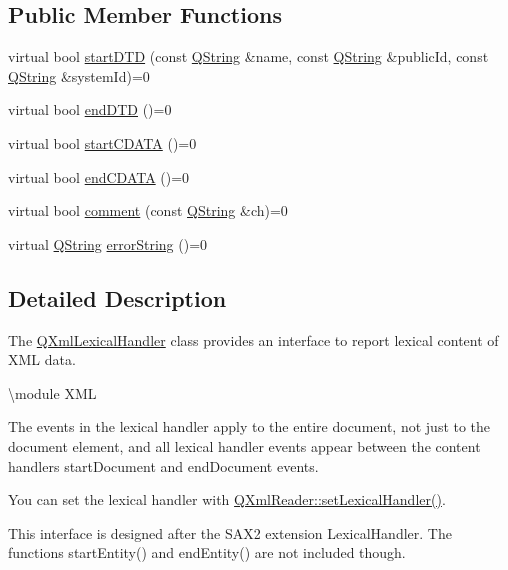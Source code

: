 \subsection*{Public Member Functions}
\begin{DoxyCompactItemize}
\item 
virtual bool \mbox{\hyperlink{class_q_xml_lexical_handler_a1bdcb91e384a32b218d04304e1116808}{start\+D\+TD}} (const \mbox{\hyperlink{class_q_string}{Q\+String}} \&name, const \mbox{\hyperlink{class_q_string}{Q\+String}} \&public\+Id, const \mbox{\hyperlink{class_q_string}{Q\+String}} \&system\+Id)=0
\item 
virtual bool \mbox{\hyperlink{class_q_xml_lexical_handler_a7f5188d7a0a54b6c276c5e7e2faa72bc}{end\+D\+TD}} ()=0
\item 
virtual bool \mbox{\hyperlink{class_q_xml_lexical_handler_a64c691b5eeae5af0230d5fad46be2df2}{start\+C\+D\+A\+TA}} ()=0
\item 
virtual bool \mbox{\hyperlink{class_q_xml_lexical_handler_af318cf25fa252c8bf7a4e8d2c4b26350}{end\+C\+D\+A\+TA}} ()=0
\item 
virtual bool \mbox{\hyperlink{class_q_xml_lexical_handler_ac71e12338ca541b374dbb88c96f15fa2}{comment}} (const \mbox{\hyperlink{class_q_string}{Q\+String}} \&ch)=0
\item 
virtual \mbox{\hyperlink{class_q_string}{Q\+String}} \mbox{\hyperlink{class_q_xml_lexical_handler_a2b1fdd6448b6a07b2af197fd3aca60d3}{error\+String}} ()=0
\end{DoxyCompactItemize}


\subsection{Detailed Description}
The \mbox{\hyperlink{class_q_xml_lexical_handler}{Q\+Xml\+Lexical\+Handler}} class provides an interface to report lexical content of X\+ML data. 

\textbackslash{}module X\+ML

The events in the lexical handler apply to the entire document, not just to the document element, and all lexical handler events appear between the content handler\textquotesingle{}s start\+Document and end\+Document events.

You can set the lexical handler with \mbox{\hyperlink{class_q_xml_reader_ab38c3816bacd14e3efcb8a5e0e5630be}{Q\+Xml\+Reader\+::set\+Lexical\+Handler()}}.

This interface is designed after the S\+A\+X2 extension Lexical\+Handler. The functions start\+Entity() and end\+Entity() are not included though.

